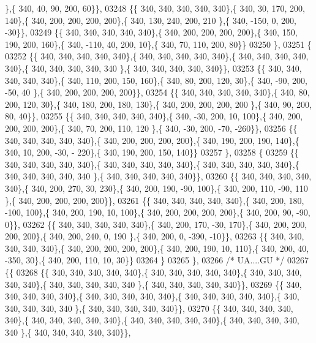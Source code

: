 \begin{DoxyCode}
      \},\{ 340,  40,  90, 200,  60\}\},
03248 \{\{ 340, 340, 340, 340, 340\},\{ 340,  30, 170, 200, 140\},\{ 340, 200, 200, 200, 200\},\{ 340, 130, 240, 200, 210
      \},\{ 340, -150,   0, 200, -30\}\},
03249 \{\{ 340, 340, 340, 340, 340\},\{ 340, 200, 200, 200, 200\},\{ 340, 150, 190, 200, 160\},\{ 340, -110,  40, 200,  
      10\},\{ 340,  70, 110, 200,  80\}\}
03250 \},
03251 \{
03252 \{\{ 340, 340, 340, 340, 340\},\{ 340, 340, 340, 340, 340\},\{ 340, 340, 340, 340, 340\},\{ 340, 340, 340, 340, 340
      \},\{ 340, 340, 340, 340, 340\}\},
03253 \{\{ 340, 340, 340, 340, 340\},\{ 340, 110, 200, 150, 160\},\{ 340,  80, 200, 120,  30\},\{ 340, -90, 200, -50,  40
      \},\{ 340, 200, 200, 200, 200\}\},
03254 \{\{ 340, 340, 340, 340, 340\},\{ 340,  80, 200, 120,  30\},\{ 340, 180, 200, 180, 130\},\{ 340, 200, 200, 200, 200
      \},\{ 340,  90, 200,  80,  40\}\},
03255 \{\{ 340, 340, 340, 340, 340\},\{ 340, -30, 200,  10, 100\},\{ 340, 200, 200, 200, 200\},\{ 340,  70, 200, 110, 120
      \},\{ 340, -30, 200, -70, -260\}\},
03256 \{\{ 340, 340, 340, 340, 340\},\{ 340, 200, 200, 200, 200\},\{ 340, 190, 200, 190, 140\},\{ 340,  10, 200, -30, -
      220\},\{ 340, 190, 200, 150, 140\}\}
03257 \},
03258 \{
03259 \{\{ 340, 340, 340, 340, 340\},\{ 340, 340, 340, 340, 340\},\{ 340, 340, 340, 340, 340\},\{ 340, 340, 340, 340, 340
      \},\{ 340, 340, 340, 340, 340\}\},
03260 \{\{ 340, 340, 340, 340, 340\},\{ 340, 200, 270,  30, 230\},\{ 340, 200, 190, -90, 100\},\{ 340, 200, 110, -90, 110
      \},\{ 340, 200, 200, 200, 200\}\},
03261 \{\{ 340, 340, 340, 340, 340\},\{ 340, 200, 180, -100, 100\},\{ 340, 200, 190,  10, 100\},\{ 340, 200, 200, 200, 
      200\},\{ 340, 200,  90, -90,   0\}\},
03262 \{\{ 340, 340, 340, 340, 340\},\{ 340, 200, 170, -30, 170\},\{ 340, 200, 200, 200, 200\},\{ 340, 200, 240,   0, 190
      \},\{ 340, 200,   0, -390, -10\}\},
03263 \{\{ 340, 340, 340, 340, 340\},\{ 340, 200, 200, 200, 200\},\{ 340, 200, 190,  10, 110\},\{ 340, 200,  40, -350,  
      30\},\{ 340, 200, 110,  10,  30\}\}
03264 \}
03265 \},
03266 \textcolor{comment}{/* UA....GU */}
03267 \{\{
03268 \{\{ 340, 340, 340, 340, 340\},\{ 340, 340, 340, 340, 340\},\{ 340, 340, 340, 340, 340\},\{ 340, 340, 340, 340, 340
      \},\{ 340, 340, 340, 340, 340\}\},
03269 \{\{ 340, 340, 340, 340, 340\},\{ 340, 340, 340, 340, 340\},\{ 340, 340, 340, 340, 340\},\{ 340, 340, 340, 340, 340
      \},\{ 340, 340, 340, 340, 340\}\},
03270 \{\{ 340, 340, 340, 340, 340\},\{ 340, 340, 340, 340, 340\},\{ 340, 340, 340, 340, 340\},\{ 340, 340, 340, 340, 340
      \},\{ 340, 340, 340, 340, 340\}\},

\end{DoxyCode}
